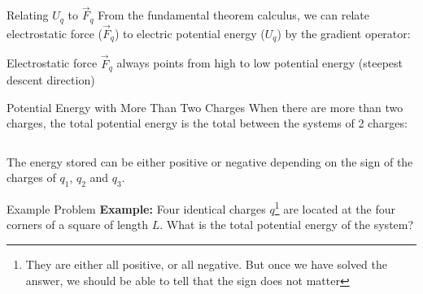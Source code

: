 \documentclass[12pt,aspectratio=169]{beamer}
\begin{document}
\begin{frame}{Relating $U_q$ to $\vec F_q$}
  From the fundamental theorem calculus, we can relate electrostatic force
  ($\vec F_q$) to electric potential energy ($U_q$) by the gradient operator:


  Electrostatic force $\vec F_q$ always points from high to low potential
  energy (steepest descent direction)
\end{frame}



\begin{frame}{Potential Energy with More Than Two Charges}
  When there are more than two charges, the total potential energy is the
  total between the systems of 2 charges:

  \vspace{.1in}
  \begin{columns}

  \end{columns}
  
  \vspace{.2in}The energy stored can be either positive or negative depending
  on the sign of the charges of $q_1$, $q_2$ and $q_3$.
\end{frame}



\begin{frame}{Example Problem}
  \textbf{Example:} Four identical charges $q$\footnote{They are either all
  positive, or all negative. But once we have solved the answer, we should be
  able to tell that the sign does not matter} are located at the four corners
  of a square of length $L$. What is the total potential energy of the system?
  \begin{center}
  \end{center}
\end{frame}
\end{document}
